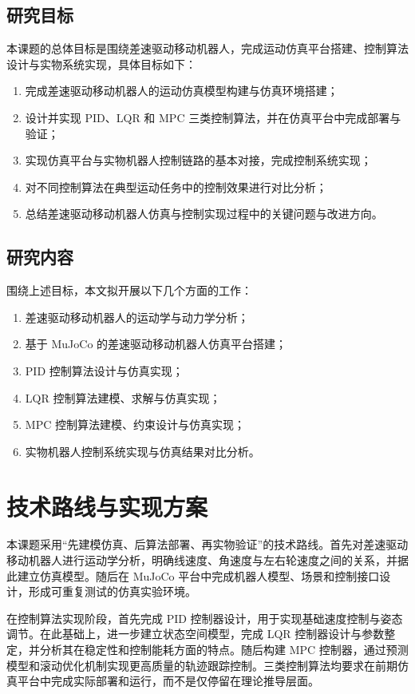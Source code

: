 \documentclass[12pt,a4paper]{ctexart}
\begin{document}
\subsection{研究目标}
本课题的总体目标是围绕差速驱动移动机器人，完成运动仿真平台搭建、控制算法设计与实物系统实现，具体目标如下：
\begin{enumerate}[label=\arabic*.]
  \item 完成差速驱动移动机器人的运动仿真模型构建与仿真环境搭建；
  \item 设计并实现 PID、LQR 和 MPC 三类控制算法，并在仿真平台中完成部署与验证；
  \item 实现仿真平台与实物机器人控制链路的基本对接，完成控制系统实现；
  \item 对不同控制算法在典型运动任务中的控制效果进行对比分析；
  \item 总结差速驱动移动机器人仿真与控制实现过程中的关键问题与改进方向。
\end{enumerate}

\subsection{研究内容}
围绕上述目标，本文拟开展以下几个方面的工作：
\begin{enumerate}[label=\arabic*.]
  \item 差速驱动移动机器人的运动学与动力学分析；
  \item 基于 MuJoCo 的差速驱动移动机器人仿真平台搭建；
  \item PID 控制算法设计与仿真实现；
  \item LQR 控制算法建模、求解与仿真实现；
  \item MPC 控制算法建模、约束设计与仿真实现；
  \item 实物机器人控制系统实现与仿真结果对比分析。
\end{enumerate}

\section{技术路线与实现方案}
本课题采用“先建模仿真、后算法部署、再实物验证”的技术路线。首先对差速驱动移动机器人进行运动学分析，明确线速度、角速度与左右轮速度之间的关系，并据此建立仿真模型。随后在 MuJoCo 平台中完成机器人模型、场景和控制接口设计，形成可重复测试的仿真实验环境。

在控制算法实现阶段，首先完成 PID 控制器设计，用于实现基础速度控制与姿态调节。在此基础上，进一步建立状态空间模型，完成 LQR 控制器设计与参数整定，并分析其在稳定性和控制能耗方面的特点。随后构建 MPC 控制器，通过预测模型和滚动优化机制实现更高质量的轨迹跟踪控制。三类控制算法均要求在前期仿真平台中完成实际部署和运行，而不是仅停留在理论推导层面。
\end{document}
